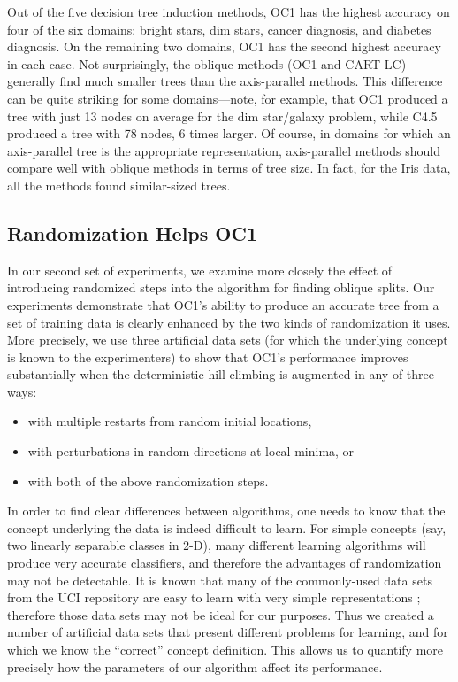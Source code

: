 Out of the five decision tree induction methods, OC1 has the highest
accuracy on four of the six domains: bright stars, dim stars, cancer
diagnosis, and diabetes diagnosis.  On the remaining two domains, OC1
has the second highest accuracy in each case.  Not surprisingly, the
oblique methods (OC1 and CART-LC) generally find much smaller trees
than the axis-parallel methods.  This difference can be quite striking
for some domains---note, for example, that OC1 produced a tree with
just 13 nodes on average for the dim star/galaxy problem, while C4.5
produced a tree with 78 nodes, 6 times larger.  Of course, in domains
for which an axis-parallel tree is the appropriate representation,
axis-parallel methods should compare well with oblique methods in
terms of tree size.  In fact, for the Iris data, all the methods found
similar-sized trees.

\subsection{Randomization Helps OC1}
\label{section:exp2}
In our second set of experiments, we examine more closely the effect
of introducing randomized steps into the algorithm for finding oblique
splits.  Our experiments demonstrate that OC1's ability to produce an
accurate tree from a set of training data is clearly enhanced by the
two kinds of randomization it uses.  More precisely, we use three
artificial data sets (for which the underlying concept is known to the
experimenters) to show that OC1's performance improves substantially
when the deterministic hill climbing is augmented in any of three
ways:
\begin{itemize}
\itemsep 0.0in
\item with multiple restarts from random initial locations, 
\item with perturbations in random directions at local minima, or
\item with both of the above randomization steps. 
\end{itemize}

In order to find clear differences between algorithms, one needs to
know that the concept underlying the data is indeed difficult to
learn.  For simple concepts (say, two linearly separable classes in
2-D), many different learning algorithms will produce very accurate
classifiers, and therefore the advantages of randomization may not be
detectable.  It is known that many of the commonly-used data sets from
the UCI repository are easy to learn with very simple representations
\cite{holte/93}; therefore those data sets may not be ideal for our
purposes.  Thus we created a number of artificial data sets that
present different problems for learning, and for which we know the
``correct'' concept definition.  This allows us to quantify more
precisely how the parameters of our algorithm affect its performance.

